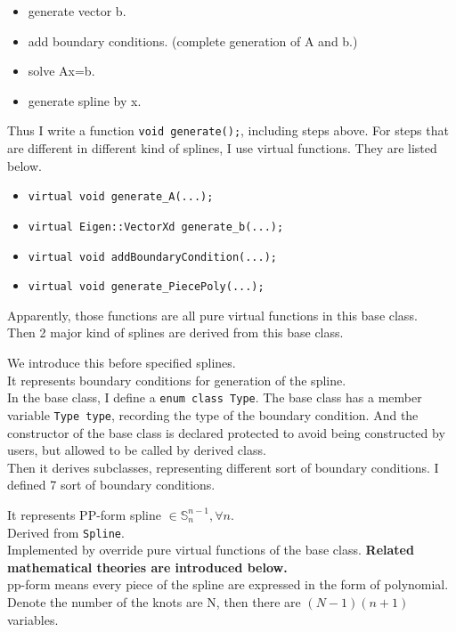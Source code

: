 \documentclass[a4paper]{article}
\begin{document}
\begin{description}
\begin{itemize}
    \item generate vector b.
    \item add boundary conditions. (complete generation of A and b.)
    \item solve Ax=b.
    \item generate spline by x.
  \end{itemize}
  Thus I write a function \texttt{void generate();}, including steps above. 
  For steps that are different in different kind of splines, I use virtual functions. They are listed below.
  \begin{itemize}
    \item \texttt{virtual void generate\_A(...);}
    \item \texttt{virtual Eigen::VectorXd generate\_b(...);}
    \item \texttt{virtual void addBoundaryCondition(...);}
    \item \texttt{virtual void generate\_PiecePoly(...);}
  \end{itemize}
  Apparently, those functions are all pure virtual functions in this base class.\\
  Then 2 major kind of splines are derived from this base class.
  \item[BoundaryCondition]
  We introduce this before specified splines.\\
  It represents boundary conditions for generation of the spline. \\
  In the base class, I define a \texttt{enum class Type}.
  The base class has a member variable \texttt{Type type}, recording the type of the boundary condition. 
  And the constructor of the base class is declared protected to avoid being constructed by users, but allowed to be called by derived class.\\
  Then it derives subclasses, representing different sort of boundary conditions. I defined 7 sort of boundary conditions.
  \item[PpFormSpline] 
  It represents PP-form spline $\in \mathbb{S}_n^{n-1}, \forall n$.\\
  Derived from \texttt{Spline}.\\
  Implemented by override pure virtual functions of the base class. \textbf{Related mathematical theories are introduced below.}\\
  pp-form means every piece of the spline are expressed in the form of polynomial. 
  Denote the number of the knots are N, then there are $(N-1)(n+1)$ variables.\\

\end{description}
\end{document}
